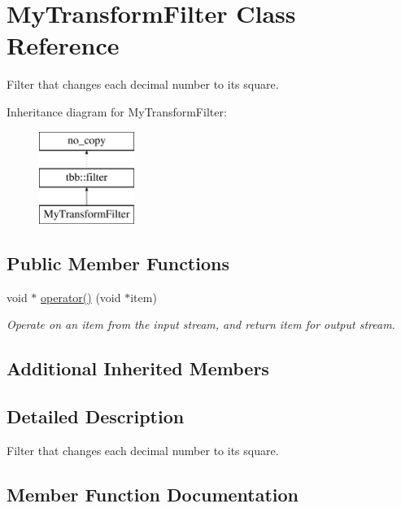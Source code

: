 \hypertarget{classMyTransformFilter}{}\section{My\+Transform\+Filter Class Reference}
\label{classMyTransformFilter}


Filter that changes each decimal number to its square.  


Inheritance diagram for My\+Transform\+Filter\+:\begin{figure}[H]
\begin{center}
\leavevmode
\includegraphics[height=3.000000cm]{classMyTransformFilter}
\end{center}
\end{figure}
\subsection*{Public Member Functions}
\begin{DoxyCompactItemize}
\item 
void $\ast$ \hyperlink{classMyTransformFilter_ae34e365ac37e83f71607e75c46a847de}{operator()} (void $\ast$item)
\begin{DoxyCompactList}\small\item\em Operate on an item from the input stream, and return item for output stream. \end{DoxyCompactList}\end{DoxyCompactItemize}
\subsection*{Additional Inherited Members}


\subsection{Detailed Description}
Filter that changes each decimal number to its square. 

\subsection{Member Function Documentation}
\hypertarget{classMyTransformFilter_ae34e365ac37e83f71607e75c46a847de}{}
